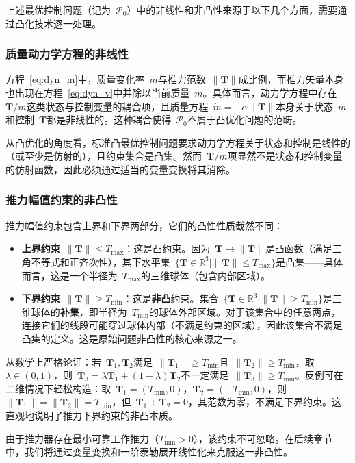 上述最优控制问题（记为~$\mathcal P_0$）中的非线性和非凸性来源于以下几个方面，需要通过凸化技术逐一处理。

\subsubsection{质量动力学方程的非线性}

方程~\eqref{eq:dyn_m}中，质量变化率~$\dot m$与推力范数~$\|\bm T\|$成比例，而推力矢量本身也出现在方程~\eqref{eq:dyn_v}中并除以当前质量~$m$。具体而言，动力学方程中存在~$\bm T/m$这类状态与控制变量的耦合项，且质量方程~$\dot m = -\alpha\|\bm T\|$本身关于状态~$m$和控制~$\bm T$都是非线性的。这种耦合使得~$\mathcal P_0$不属于凸优化问题的范畴。

从凸优化的角度看，标准凸最优控制问题要求动力学方程关于状态和控制是线性的（或至少是仿射的），且约束集合是凸集。然而~$\bm T/m$项显然不是状态和控制变量的仿射函数，因此必须通过适当的变量变换将其消除。

\subsubsection{推力幅值约束的非凸性}

推力幅值约束包含上界和下界两部分，它们的凸性性质截然不同：
\begin{itemize}
  \item \textbf{上界约束}~$\|\bm T\|\le T_{\max}$：这是凸约束。因为~$\bm T\mapsto\|\bm T\|$是凸函数（满足三角不等式和正齐次性），其下水平集~$\{\bm T\in\mathbb{R}^3\mid \|\bm T\|\le T_{\max}\}$是凸集——具体而言，这是一个半径为~$T_{\max}$的三维球体（包含内部区域）。
  \item \textbf{下界约束}~$\|\bm T\|\ge T_{\min}$：这是\textbf{非凸}约束。集合~$\{\bm T\in\mathbb{R}^3\mid \|\bm T\|\ge T_{\min}\}$是三维球体的\textbf{补集}，即半径为~$T_{\min}$的球体外部区域。对于该集合中的任意两点，连接它们的线段可能穿过球体内部（不满足约束的区域），因此该集合不满足凸集的定义。这是原始问题非凸性的核心来源之一。
\end{itemize}

从数学上严格论证：若~$\bm T_1,\bm T_2$满足~$\|\bm T_1\|\ge T_{\min}$且~$\|\bm T_2\|\ge T_{\min}$，取~$\lambda\in(0,1)$，则~$\bm T_3 = \lambda\bm T_1 + (1-\lambda)\bm T_2$不一定满足~$\|\bm T_3\|\ge T_{\min}$。反例可在二维情况下轻松构造：取~$\bm T_1=(T_{\min},0)$，$\bm T_2=(-T_{\min},0)$，则~$\|\bm T_1\|=\|\bm T_2\|=T_{\min}$，但~$\bm T_1+\bm T_2=0$，其范数为零，不满足下界约束。这直观地说明了推力下界约束的非凸本质。

由于推力器存在最小可靠工作推力（$T_{\min}>0$），该约束不可忽略。在后续章节中，我们将通过变量变换和一阶泰勒展开线性化来克服这一非凸性。

